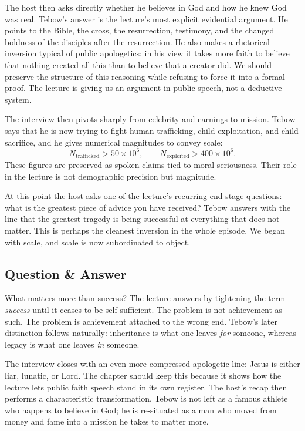 The host then asks directly whether he believes in God and how he knew God was real. Tebow's answer is the lecture's most explicit evidential argument. He points to the Bible, the cross, the resurrection, testimony, and the changed boldness of the disciples after the resurrection. He also makes a rhetorical inversion typical of public apologetics: in his view it takes more faith to believe that nothing created all this than to believe that a creator did. We should preserve the structure of this reasoning while refusing to force it into a formal proof. The lecture is giving us an argument in public speech, not a deductive system.

The interview then pivots sharply from celebrity and earnings to mission. Tebow says that he is now trying to fight human trafficking, child exploitation, and child sacrifice, and he gives numerical magnitudes to convey scale:
\begin{equation}
N_{\text{trafficked}} > 50\times 10^6, \qquad
N_{\text{exploited}} > 400\times 10^6.
\end{equation}
These figures are preserved as spoken claims tied to moral seriousness. Their role in the lecture is not demographic precision but magnitude.

At this point the host asks one of the lecture's recurring end-stage questions: what is the greatest piece of advice you have received? Tebow answers with the line that the greatest tragedy is being successful at everything that does not matter. This is perhaps the cleanest inversion in the whole episode. We began with scale, and scale is now subordinated to object.

\subsection{Question \& Answer}

What matters more than success? The lecture answers by tightening the term \emph{success} until it ceases to be self-sufficient. The problem is not achievement as such. The problem is achievement attached to the wrong end. Tebow's later distinction follows naturally: inheritance is what one leaves \emph{for} someone, whereas legacy is what one leaves \emph{in} someone.

The interview closes with an even more compressed apologetic line: Jesus is either liar, lunatic, or Lord. The chapter should keep this because it shows how the lecture lets public faith speech stand in its own register. The host's recap then performs a characteristic transformation. Tebow is not left as a famous athlete who happens to believe in God; he is re-situated as a man who moved from money and fame into a mission he takes to matter more.

